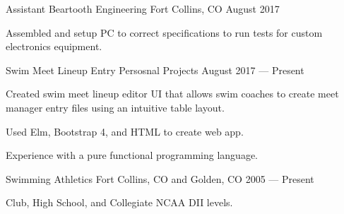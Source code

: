 \begin{cventries}
  \cventry
    {Assistant} %
    {Beartooth Engineering} %
    {Fort Collins, CO} %
    {August 2017} %
    {
      \begin{cvitems} %
        \item {Assembled and setup PC to correct specifications to run tests for custom electronics equipment.}
      \end{cvitems}
    }


  \cventry
    {Swim Meet Lineup Entry}
    {Persosnal Projects} %
    {} %
    {August 2017 --- Present} %
    {
      \begin{cvitems} %
        \item {Created swim meet lineup editor UI that allows swim coaches to create meet manager entry files using an intuitive table layout.}
        \item {Used Elm, Bootstrap 4, and HTML to create web app.}
        \item {Experience with a pure functional programming language.}
        \end{cvitems}
   }

 \cventry
    {Swimming} %
    {Athletics} %
    {Fort Collins, CO and Golden, CO} %
    {2005 --- Present} %
    {
      \begin{cvitems} %
        \item {Club, High School, and Collegiate NCAA DII levels.}
      \end{cvitems}
   }

\end{cventries}
